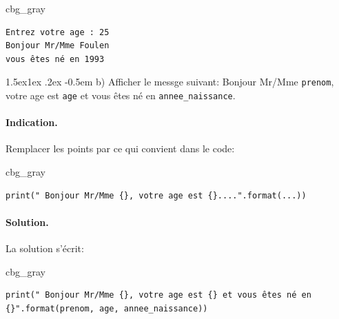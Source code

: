 \documentclass[%
oneside,                 %
final,                   %
10pt,french]{article}
\makeatletter
\newenvironment{_cod_tight}[1]{
   \def\FrameCommand{\colorbox{#1}}
   \FrameRule0.6pt\MakeFramed {\FrameRestore}\vskip3mm}
   {\vskip0mm\endMakeFramed}
\newenvironment{cod}[1]{
\bgroup\rmfamily
\fboxsep=0mm\relax
\begin{_cod_tight}{#1}
\list{}{\parsep=-2mm\parskip=0mm\topsep=0pt\leftmargin=2mm
\rightmargin=2\leftmargin\leftmargin=4pt\relax}
\item\relax}
{\endlist\end{_cod_tight}\egroup}
\newenvironment{doconceexercise}{}{}
\newcommand\subex{\@startsection{paragraph}{4}{\z@}%
                  {1.5ex\@plus1ex \@minus.2ex}%
                  {-0.5em}%
                  {\normalfont\normalsize\bfseries}}
\makeatother
\begin{document}
\begin{doconceexercise}
\begin{cod}{cbg_gray}
\begin{verbatim}
Entrez votre age : 25
Bonjour Mr/Mme Foulen
vous êtes né en 1993
\end{verbatim}
\end{cod}
\noindent

\subex{b)}
Afficher le messge suivant:
Bonjour Mr/Mme \texttt{prenom}, votre age est \texttt{age} et vous êtes né en \Verb!annee_naissance!.


\paragraph{Indication.}
Remplacer les points par ce qui convient dans le code:
\begin{cod}{cbg_gray}\begin{verbatim}
print(" Bonjour Mr/Mme {}, votre age est {}....".format(...))
\end{verbatim}
\end{cod}
\noindent



\paragraph{Solution.}
La solution s'écrit:
\begin{cod}{cbg_gray}\begin{verbatim}
print(" Bonjour Mr/Mme {}, votre age est {} et vous êtes né en {}".format(prenom, age, annee_naissance))
\end{verbatim}
\end{cod}
\noindent

\end{doconceexercise}


\end{document}
